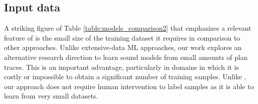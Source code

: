 \subsection{Input data}
A striking figure of Table \ref{table:models_comparison2} that emphasizes a relevant feature of \FAMA is the small size of the training dataset it requires in comparison to other approaches. Unlike extensive-data ML approaches, our work explores an alternative research direction to learn sound models from small amounts of plan traces. This is an important advantage, particularly in domains in which it is costly or impossible to obtain a significant number of training samples. Unlike \CAMA, our approach does not require human intervention to label samples as it is able to learn from very small datasets.


























